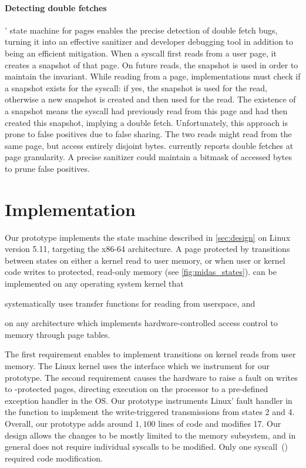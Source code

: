 \documentclass[letterpaper,twocolumn,10pt]{article}
\begin{document}
\paragraph{Detecting double fetches}
\midas' state machine for pages enables the precise detection of double fetch
bugs, turning it into an effective sanitizer and developer debugging tool in
addition to being an efficient mitigation.
When a syscall first reads from a user page, it creates a snapshot
of that page.
On future reads, the snapshot is used in order to maintain the
invariant.
While reading from a page, implementations must check
if a snapshot exists for the syscall: if yes, the snapshot is used
for the read, otherwise a new snapshot is created and then used
for the read.
The existence of a snapshot means the syscall had previously
read from this page and had then created this snapshot, implying a double
fetch.
Unfortunately, this approach is prone to false positives due to false sharing.
The two reads might read from the same page, but access entirely
disjoint bytes.
\midas currently reports double fetches at page granularity.
A precise sanitizer could maintain a bitmask of accessed bytes to
prune false positives.


\section{\midas Implementation}
\label{sec:impl}

Our \midas prototype implements the state machine described in
\autoref{sec:design} on Linux version 5.11, targeting the x86-64
architecture.
A page protected by \midas transitions between states on
either a kernel read to user memory, or when user or kernel code
writes to protected, read-only memory (see \autoref{fig:midas_states}).
\midas can be implemented on any operating system kernel that
\begin{inparaenum}
\item systematically uses transfer functions for reading from userspace, and
\item on any architecture which implements hardware-controlled access
control to memory through page tables.
\end{inparaenum}
The first requirement enables \midas to implement transitions on
kernel reads from user memory.
The Linux kernel uses the  interface which
we instrument for our prototype.
The second requirement causes the hardware to raise a fault on
writes to \midas-protected pages,
directing execution on the processor to a pre-defined exception
handler in the OS.
Our prototype instruments Linux' fault handler in the function
 to implement the write-triggered transmissions
from states 2 and 4.
Overall, our prototype adds around $1,100$ lines of code and modifies
17.
Our design allows the changes to be mostly limited to the memory
subsystem, and in general does not require individual syscalls to
be modified.
Only one syscall~() required code modification.
\end{document}
